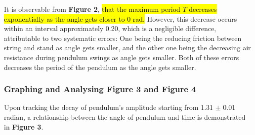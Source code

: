 \documentclass{article}
\begin{document}
It is observable from \textbf{Figure 2}, \hl{ that the maximum period $T$  decreases exponentially as the angle gets closer to 0 rad.} However, this decrease occurs within an interval approximately 0.20, which is a negligible difference, attributable to two systematic errors: One being the reducing friction between string and stand as angle gets smaller, and the other one being the decreasing air resistance during pendulum swings as angle gets smaller. Both of these errors decreases the period of the pendulum as the angle gets smaller.

\subsubsection{Graphing and Analysing Figure 3 and Figure 4}

Upon tracking the decay of pendulum's amplitude starting from 1.31 $\pm$ 0.01 radian, a relationship between the angle of pendulum and time is demonstrated in \textbf{Figure 3}. 
\end{document}
